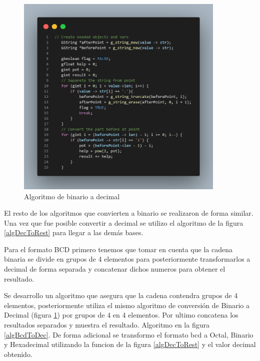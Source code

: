 \documentclass[letterpaper,12pt]{extarticle}%
\begin{document}
			\begin{figure}[H]
			\begin{center}
			\includegraphics[width=10cm]{imag//algBinToDec.png}
			\caption{Algoritmo de binario a decimal}
			\label{algBinToDec}
			\end{center}
			\end{figure}

			El resto de los algoritmos que convierten a binario se realizaron de forma similar. Una vez que fue
			posible convertir a decimal se utilizo el algoritmo de la figura \ref{algDecToRest} para llegar a las 
			demás bases.

			Para el formato BCD primero tenemos que tomar en cuenta que la cadena binaria se divide en grupos de 
			4 elementos para posteriormente transformarlos a decimal de forma separada y concatenar dichos numeros para 
			obtener el resultado.

			Se desarrollo un algoritmo que asegura que la cadena contendra grupos de 4 elementos, posteriormente utiliza 
			el mismo algoritmo de conversión de Binario a Decimal (figura \ref{algBinToDec}) por grupos de 4 en 4 elementos.
			Por ultimo concatena los resultados separados y muestra el resultado. Algoritmo en la figura \ref{algBcdToDec}.
			De forma adicional se transformo el formato bcd a Octal, Binario y Hexadecimal utilizando la funcion de la figura 
			\ref{algDecToRest} y el valor decimal obtenido.
\end{document}
